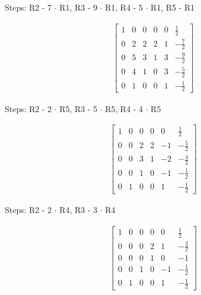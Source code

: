 \documentclass[12pt, letterpaper]{../assignment}
\begin{document}
Steps: R2 - 7 $\cdot$ R1, R3 - 9 $\cdot$ R1, R4 - 5 $\cdot$ R1, R5 - R1

\begin{equation*}
    \begin{aligned}
        \left[\begin{array}{ccccc|c} 
            1 & 0 & 0 & 0 & 0 & \frac{1}{2}\\
            0 & 2 & 2 & 2 & 1 & -\frac{7}{2}\\
            0 & 5 & 3 & 1 & 3 & -\frac{9}{2}\\
            0 & 4 & 1 & 0 & 3 & -\frac{5}{2}\\
            0 & 1 & 0 & 0 & 1 & -\frac{1}{2}
        \end{array}\right]
    \end{aligned}
\end{equation*}

Steps: R2 - 2 $\cdot$ R5, R3 - 5 $\cdot$ R5, R4 - 4 $\cdot$ R5

\begin{equation*}
    \begin{aligned}
        \left[\begin{array}{ccccc|c} 
            1 & 0 & 0 & 0 & 0 & \frac{1}{2}\\
            0 & 0 & 2 & 2 & -1 & -\frac{5}{2}\\
            0 & 0 & 3 & 1 & -2 & -\frac{4}{2}\\
            0 & 0 & 1 & 0 & -1 & -\frac{1}{2}\\
            0 & 1 & 0 & 0 & 1 & -\frac{1}{2}
        \end{array}\right]
    \end{aligned}
\end{equation*}

Steps: R2 - 2 $\cdot$ R4, R3 - 3 $\cdot$ R4

\begin{equation*}
    \begin{aligned}
        \left[\begin{array}{ccccc|c} 
            1 & 0 & 0 & 0 & 0 & \frac{1}{2}\\
            0 & 0 & 0 & 2 & 1 & -\frac{3}{2}\\
            0 & 0 & 0 & 1 & 0 & -1\\
            0 & 0 & 1 & 0 & -1 & -\frac{1}{2}\\
            0 & 1 & 0 & 0 & 1 & -\frac{1}{2}
        \end{array}\right]
    \end{aligned}
\end{equation*}
\end{document}
